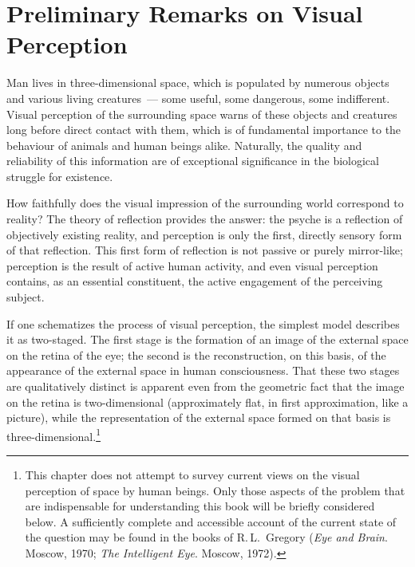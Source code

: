 \chapter{Preliminary Remarks on Visual Perception}


Man lives in three-dimensional space, which is populated by numerous objects and
various living creatures~--- some useful, some dangerous, some indifferent.  Visual
perception of the surrounding space warns of these objects and creatures long before
direct contact with them, which is of fundamental importance to the behaviour of
animals and human beings alike.  Naturally, the quality and reliability of this
information are of exceptional significance in the biological struggle for existence.

How faithfully does the visual impression of the surrounding world correspond to
reality?  The theory of reflection provides the answer: the psyche is a reflection of
objectively existing reality, and perception is only the first, directly sensory form of
that reflection.  This first form of reflection is not passive or purely mirror-like;
perception is the result of active human activity, and even visual perception contains,
as an essential constituent, the active engagement of the perceiving subject.

If one schematizes the process of visual perception, the simplest model describes it
as two-staged.  The first stage is the formation of an image of the external space on the
retina of the eye; the second is the reconstruction, on this basis, of the appearance of
the external space in human consciousness.  That these two stages are qualitatively
distinct is apparent even from the geometric fact that the image on the retina is
two-dimensional (approximately flat, in first approximation, like a picture), while the
representation of the external space formed on that basis is three-dimensional.\footnote{%
  This chapter does not attempt to survey current views on the visual perception of
  space by human beings.  Only those aspects of the problem that are indispensable for
  understanding this book will be briefly considered below.  A sufficiently complete and
  accessible account of the current state of the question may be found in the books of
  R.\,L.~Gregory (\emph{Eye and Brain}. Moscow, 1970; \emph{The Intelligent Eye}.
  Moscow, 1972).}

